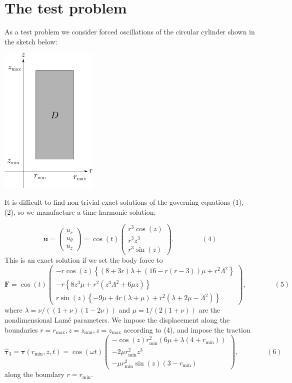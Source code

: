 \hypertarget{index_test}{}\section{The test problem}\label{index_test}
As a test problem we consider forced oscillations of the circular cylinder shown in the sketch below\+:  
\begin{DoxyImage}
\includegraphics[width=0.35\textwidth]{geom}
\end{DoxyImage}


It is difficult to find non-\/trivial exact solutions of the governing equations (1), (2), so we manufacture a time-\/harmonic solution\+:

\[ \mathbf{u} = \begin{pmatrix} u_r\\ u_\theta\\ u_z \end{pmatrix} = \cos(t) \begin{pmatrix} r^3\cos(z)\\ r^3z^3\\ r^3\sin(z) \end{pmatrix}.\qquad\qquad (4) \] This is an exact solution if we set the body force to \[ \mathbf{F} = \cos(t) \begin{pmatrix} -r\cos(z)\left\{\left(8+3r\right)\lambda + \left(16 - r\left(r-3\right)\right)\mu + r^2\Lambda^2\right\}\\ -r\left\{8z^3\mu + r^2\left(z^3\Lambda^2 + 6\mu z\right)\right\}\\ r\sin(z)\left\{- 9\mu + 4r\left(\lambda + \mu\right) + r^2\left(\lambda + 2\mu - \Lambda^2\right)\right\} \end{pmatrix},\qquad\qquad (5) \] where $ \lambda = \nu/((1+\nu)(1-2\nu)) $ and $ \mu = 1/(2(1+\nu)) $ are the nondimensional Lam\'{e} parameters. We impose the displacement along the boundaries $ r=r_\mathrm{max}, z=z_\mathrm{min}, z=z_\mathrm{max} $ according to (4), and impose the traction \[ \hat{\bm{\tau}}_3 = \bm{\tau}(r_\mathrm{min},z,t) = \cos(\omega t) \begin{pmatrix} -\cos(z)r_\mathrm{min}^2\left(6\mu + \lambda\left(4+r_\mathrm{min}\right)\right)\\ -2\mu r_\mathrm{min}^2z^3\\ -\mu r_\mathrm{min}^2\sin(z)\left(3-r_\mathrm{min}\right) \end{pmatrix},\qquad\qquad (6) \] along the boundary $ r = r_\mathrm{min} $.

